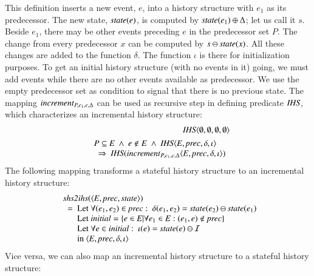 \documentclass{elsarticle}
\def\id#1{\text{\it #1\/}}
\def\Events{{\mathit E}}
\begin{document}
	This definition inserts a new event, $e$, into a history structure with $e_1$ as its predecessor.
	The new state, $\id{state}(e)$, is computed by $\id{state}(e_1)\oplus\Delta$; let us call it $s$.
	Beside $e_1$, there may be other events preceding $e$ in the predecessor set $P$.
	The change from every predecessor $x$ can be computed by $s\ominus\id{state}(x)$.
	All these changes are added to the function $\delta$.
	The function $\iota$ is there for initialization purposes.
	To get an initial history structure (with no events in it) going,
	we must add events while there are no other events available as predecessor.
	We use the empty predecessor set as condition to signal that there is no previous state.
	The mapping $\id{increment}_{P,e_1,e,\Delta}$ can be used as recursive step in defining predicate $\id{IHS}$,
	which characterizes an incremental history structure:
\begin{eqnarray}
	&&\id{IHS}\la \emptyset, \emptyset, \emptyset, \emptyset\ra\\
&&\begin{array}{@{}l}
	P\subseteq\Events\ \wedge\ e\notin E\ \wedge\ \id{IHS}\la \Events, \id{prec}, \delta, \iota\ra\\
	\ \ \Rightarrow\ \id{IHS}(\id{increment}_{P,e_1,e,\Delta}\la \Events, \id{prec}, \delta, \iota\ra)
\end{array}
\label{req:recursive def IHS}
\end{eqnarray}
The following mapping transforms a stateful history structure to an incremental history structure:
\begin{eqnarray}
&&\begin{array}{l}
	\id{shs2ihs}(\la\Events, \id{prec}, \id{state}\ra)\\
	\ \ =\ \begin{array}[t]{@{}l}
		\text{Let }\forall(e_1,e_2)\in\id{prec}:\ \delta(e_1,e_2)=\id{state}(e_2)\ominus\id{state}(e_1)\\
		\text{Let }\id{initial}=\{e\in\Events|\forall e_1\in\Events: (e_1,e)\notin\id{prec}\}\\
		\text{Let }\forall e\in\id{initial}:\ \iota(e)=\id{state}(e)\ominus\mathcal I\\
		\text{in }\la\Events, \id{prec}, \delta, \iota\ra
		\end{array}
\end{array}
\label{req:shs2ihs}
\end{eqnarray}
	Vice versa, we can also map an incremental history structure to a stateful history structure:
\end{document}
